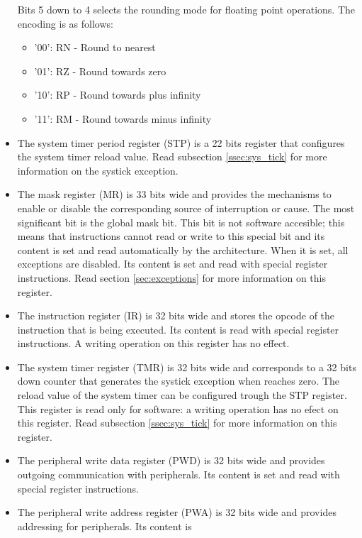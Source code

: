 \begin{itemize}
         Bits 5 down to 4 selects the rounding mode for floating point operations. The encoding is as follows:
         \begin{itemize}
          \item '00’: RN - Round to nearest
          \item '01’: RZ - Round towards zero
          \item '10’: RP - Round towards plus infinity
          \item '11’: RM - Round towards minus infinity
         \end{itemize}
   \item The system timer period register (STP) is a 22 bits register that configures the system timer reload value.
         Read subsection \ref{ssec:sys_tick} for more information on the systick exception.
   \item The mask register (MR) is 33 bits wide and provides the mechanisms to enable or disable the corresponding source of interruption
         or cause. The most significant bit is the global mask bit. This bit is not software accesible; this means that instructions
         cannot read or write to this special bit and its content is set and read automatically by the architecture. When it is set, all
         exceptions are disabled. Its content is set and read with special register instructions. Read section \ref{sec:exceptions}
         for more information on this register.
   \item The instruction register (IR) is 32 bits wide and stores the opcode of the instruction that is being executed. Its content is
         read with special register instructions. A writing operation on this register has no effect.
   \item The system timer register (TMR) is 32 bits wide and corresponds to a 32 bits down counter that generates the systick exception
         when reaches zero. The reload value of the system timer can be configured trough the STP register. This register is read only for software:
         a writing operation has no efect on this register. Read subsection \ref{ssec:sys_tick} for more information on this register.
   \item The peripheral write data register (PWD) is 32 bits wide and provides outgoing communication with peripherals. Its content is
         set and read with special register instructions.
   \item The peripheral write address register (PWA) is 32 bits wide and provides addressing for peripherals. Its content is

\end{itemize}
